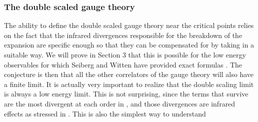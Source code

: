 \documentclass[a4paper,12pt]{article}
\begin{document}
\subsubsection{The double scaled gauge theory}
%
The ability to define the double scaled gauge theory near the critical 
points relies on the fact that the infrared divergences responsible for 
the breakdown of the \coordHE{} expansion \cite{fer}
are specific enough so that they can
be compensated for by taking \coordHE{} in a suitable way. 
We will prove in Section 3 that this is possible for the low energy
observables for which Seiberg and Witten have provided
exact formulas \cite{SW}. The conjecture is then that all the other
correlators of the gauge theory will also have a finite limit. It is 
actually very important to realize that the double scaling limit is
always a low energy limit. This is not surprising, since the
terms that survive are the most divergent at
each order in \coordHE{}, and those divergences are infrared effects as
stressed in \cite{fer}. This is also the simplest way to understand 
\end{document}

